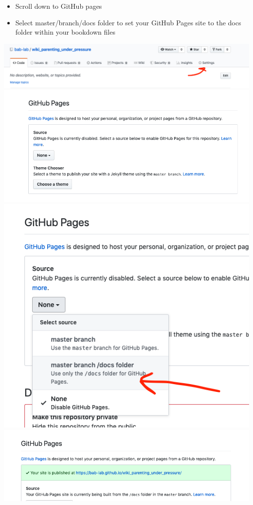 \documentclass[]{book}
\providecommand{\tightlist}{%
  \setlength{\itemsep}{0pt}\setlength{\parskip}{0pt}}
\begin{document}
\begin{itemize}
\tightlist
\item
  Scroll down to GitHub pages
\item
  Select master/branch/docs folder to set your GitHub Pages site to the docs folder within your bookdown files
\end{itemize}

\includegraphics{images/research_protocols/wiki/3.png}
\includegraphics{images/research_protocols/wiki/4.png}
\includegraphics{images/research_protocols/wiki/5.png}
\includegraphics{images/research_protocols/wiki/6.png}
\end{document}
